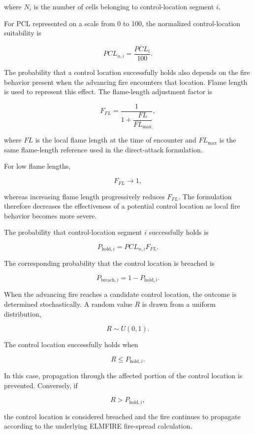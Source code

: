 where $N_i$ is the number of cells belonging to control-location segment $i$.

For PCL represented on a scale from 0 to 100, the normalized control-location
suitability is

\[
PCL_{n,i}
=
\frac{\overline{PCL}_i}{100}.
\]

The probability that a control location successfully holds also depends on the
fire behavior present when the advancing fire encounters that location. Flame
length is used to represent this effect. The flame-length adjustment factor is

\[
F_{FL}
=
\frac{1}
     {1+\dfrac{FL}{FL_{\max}}},
\]

where $FL$ is the local flame length at the time of encounter and $FL_{\max}$ is
the same flame-length reference used in the direct-attack formulation.

For low flame lengths,

\[
F_{FL} \rightarrow 1,
\]

whereas increasing flame length progressively reduces $F_{FL}$. The formulation
therefore decreases the effectiveness of a potential control location as local
fire behavior becomes more severe.

The probability that control-location segment $i$ successfully holds is

\[
P_{\mathrm{hold},i}
=
PCL_{n,i}F_{FL}.
\]

The corresponding probability that the control location is breached is

\[
P_{\mathrm{breach},i}
=
1-P_{\mathrm{hold},i}.
\]

When the advancing fire reaches a candidate control location, the outcome is
determined stochastically. A random value $R$ is drawn from a uniform
distribution,

\[
R
\sim
U(0,1).
\]

The control location successfully holds when

\[
R
\leq
P_{\mathrm{hold},i}.
\]

In this case, propagation through the affected portion of the control location
is prevented. Conversely, if

\[
R
>
P_{\mathrm{hold},i},
\]

the control location is considered breached and the fire continues to propagate
according to the underlying ELMFIRE fire-spread calculation.





















